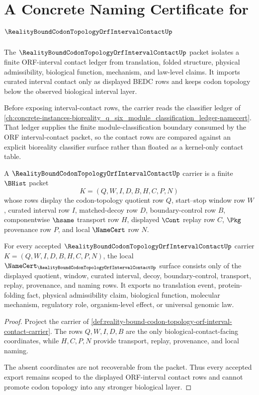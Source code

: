 \chapter{A Concrete Naming Certificate for $\RealityBoundCodonTopologyOrfIntervalContactUp$}
\label{ch:concrete-instances-reality-bound-codon-topology-orf-interval-contact-namecert}

The $\RealityBoundCodonTopologyOrfIntervalContactUp$ packet isolates a finite ORF-interval contact ledger from translation, folded structure, physical admissibility, biological function, mechanism, and law-level claims. It imports curated interval contact only as displayed BEDC rows and keeps codon topology below the observed biological interval layer.

Before exposing interval-contact rows, the carrier reads the classifier ledger of \autoref{ch:concrete-instances-bioreality_q_six_module_classification_ledger-namecert}. That ledger supplies the finite module-classification boundary consumed by the ORF interval-contact packet, so the contact rows are compared against an explicit bioreality classifier surface rather than floated as a kernel-only contact table.

\begin{definition}
\label{def:reality-bound-codon-topology-orf-interval-contact-carrier}
A $\RealityBoundCodonTopologyOrfIntervalContactUp$ carrier is a finite $\BHist$ packet
$$
K=(Q,W,I,D,B,H,C,P,N)
$$
whose rows display the codon-topology quotient row $Q$, start--stop window row $W$, curated interval row $I$, matched-decoy row $D$, boundary-control row $B$, componentwise $\hsame$ transport row $H$, displayed $\Cont$ replay row $C$, $\Pkg$ provenance row $P$, and local $\NameCert$ row $N$.
\end{definition}

\begin{theorem}
\label{thm:reality-bound-codon-topology-orf-interval-contact-namecert-obligations}
For every accepted $\RealityBoundCodonTopologyOrfIntervalContactUp$ carrier $K=(Q,W,I,D,B,H,C,P,N)$, the local $\NameCert_{\RealityBoundCodonTopologyOrfIntervalContactUp}$ surface consists only of the displayed quotient, window, curated interval, decoy, boundary-control, transport, replay, provenance, and naming rows. It exports no translation event, protein-folding fact, physical admissibility claim, biological function, molecular mechanism, regulatory role, organism-level effect, or universal genomic law.
\end{theorem}
\begin{proof}
Project the carrier of \autoref{def:reality-bound-codon-topology-orf-interval-contact-carrier}. The rows $Q,W,I,D,B$ are the only biological-contact-facing coordinates, while $H,C,P,N$ provide transport, replay, provenance, and local naming.

The absent coordinates are not recoverable from the packet. Thus every accepted export remains scoped to the displayed ORF-interval contact rows and cannot promote codon topology into any stronger biological layer.
\end{proof}

